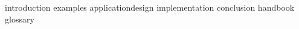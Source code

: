 \documentclass[11pt,a4paper]{report}
\newcommand{\texdir}{../tex/} %
\begin{document}
\inserttitlepage


\inserttoc

{introduction}
{examples}
{applicationdesign}
{implementation}
{conclusion}
\appendix
{handbook}
{glossary}

%
\end{document}
